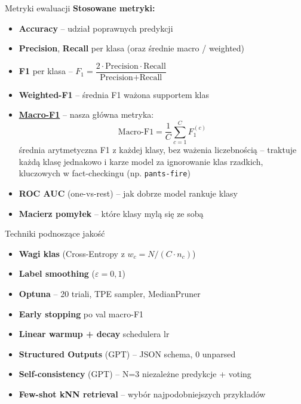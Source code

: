 \documentclass[10pt]{beamer}
\begin{document}
\begin{frame}{Metryki ewaluacji}
  \small
  \textbf{Stosowane metryki:}
  \begin{itemize}
    \item \textbf{Accuracy} -- udział poprawnych predykcji
    \item \textbf{Precision}, \textbf{Recall} per klasa (oraz średnie macro / weighted)
    \item \textbf{F1} per klasa -- $F_1 = \dfrac{2 \cdot \text{Precision} \cdot \text{Recall}}{\text{Precision} + \text{Recall}}$
    \item \textbf{Weighted-F1} -- średnia F1 ważona supportem klas
    \item \textbf{\underline{Macro-F1}} -- nasza główna metryka:
    \[
      \text{Macro-F1} = \frac{1}{C} \sum_{c=1}^{C} F_1^{(c)}
    \]
    średnia arytmetyczna F1 z każdej klasy, bez ważenia liczebnością --
    traktuje każdą klasę jednakowo i karze model za ignorowanie klas rzadkich,
    kluczowych w fact-checkingu (np. \texttt{pants-fire})
    \item \textbf{ROC AUC} (one-vs-rest) -- jak dobrze model rankuje klasy
    \item \textbf{Macierz pomyłek} -- które klasy mylą się ze sobą
  \end{itemize}
\end{frame}

\begin{frame}{Techniki podnoszące jakość}
  \begin{itemize}
    \item \textbf{Wagi klas} (Cross-Entropy z $w_c = N/(C \cdot n_c)$)
    \item \textbf{Label smoothing} ($\varepsilon = 0{,}1$)
    \item \textbf{Optuna} -- 20 triali, TPE sampler, MedianPruner
    \item \textbf{Early stopping} po val macro-F1
    \item \textbf{Linear warmup + decay} schedulera lr
    \item \textbf{Structured Outputs} (GPT) -- JSON schema, 0 unparsed
    \item \textbf{Self-consistency} (GPT) -- N=3 niezależne predykcje + voting
    \item \textbf{Few-shot kNN retrieval} -- wybór najpodobniejszych przykładów
  \end{itemize}

\end{frame}
\end{document}
